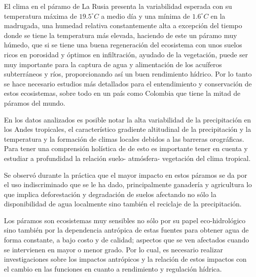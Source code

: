 \documentclass[conference,final,]{IEEEtran}
\begin{document}
El clima en el páramo de La Rusia presenta la variabilidad esperada con
su temperatura máxima de \(19.5^{\circ}C\) a medio día y una mínima de
\(1.6^{\circ}C\) en la madrugada, una humedad relativa constantemente
alta a excepción del tiempo donde se tiene la temperatura más elevada,
haciendo de este un páramo muy húmedo, que si se tiene una buena
regeneración del ecosistema con unos suelos ricos en porosidad y óptimos
en infiltración, ayudado de la vegetación, puede ser muy importante para
la captura de agua y alimentación de los acuíferos subterráneos y ríos,
proporcionando así un buen rendimiento hídrico. Por lo tanto se hace
necesario estudios más detallados para el entendimiento y conservación
de estos ecosistemas, sobre todo en un país como Colombia que tiene la
mitad de páramos del mundo.

En los datos analizados es posible notar la alta variabilidad de la
precipitación en los Andes tropicales, el característico gradiente
altitudinal de la precipitación y la temperatura y la formación de
climas locales debidos a las barreras orográficas. Para tener una
comprensión holística de de esto es importante tener en cuenta y
estudiar a profundidad la relación suelo- atmósfera- vegetación del
clima tropical.

Se observó durante la práctica que el mayor impacto en estos páramos se
da por el uso indiscriminado que se le ha dado, principalmente ganadería
y agricultura lo que implica deforestación y degradación de suelos
afectando no sólo la disponibilidad de agua localmente sino también el
reciclaje de la precipitación.

Los páramos son ecosistemas muy sensibles no sólo por su papel
eco-hidrológico sino también por la dependencia antrópica de estas
fuentes para obtener agua de forma constante, a bajo costo y de calidad;
aspectos que se ven afectados cuando se intervienen en mayor o menor
grado. Por lo cual, es necesario realizar investigaciones sobre los
impactos antrópicos y la relación de estos impactos con el cambio en las
funciones en cuanto a rendimiento y regulación hídrica.


\end{document}
